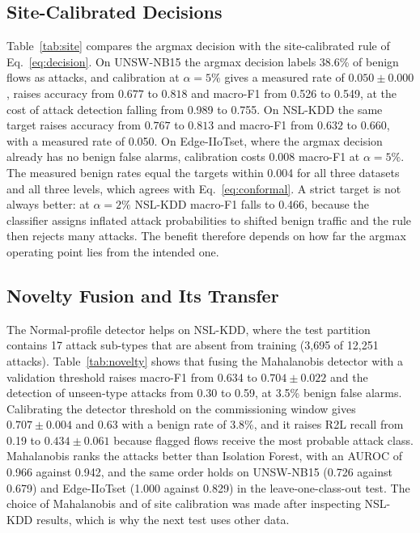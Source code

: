 \documentclass[journal]{IEEEtran}
\begin{document}
\subsection{Site-Calibrated Decisions}
Table~\ref{tab:site} compares the argmax decision with the site-calibrated rule of Eq.~\eqref{eq:decision}. On UNSW-NB15 the argmax decision labels 38.6\% of benign flows as attacks, and calibration at $\alpha=5\%$ gives a measured rate of $0.050\pm0.000$, raises accuracy from $0.677$ to $0.818$ and macro-F1 from 0.526 to 0.549, at the cost of attack detection falling from 0.989 to 0.755. On NSL-KDD the same target raises accuracy from $0.767$ to $0.813$ and macro-F1 from $0.632$ to $0.660$, with a measured rate of 0.050. On Edge-IIoTset, where the argmax decision already has no benign false alarms, calibration costs 0.008 macro-F1 at $\alpha=5\%$. The measured benign rates equal the targets within 0.004 for all three datasets and all three levels, which agrees with Eq.~\eqref{eq:conformal}. A strict target is not always better: at $\alpha=2\%$ NSL-KDD macro-F1 falls to 0.466, because the classifier assigns inflated attack probabilities to shifted benign traffic and the rule then rejects many attacks. The benefit therefore depends on how far the argmax operating point lies from the intended one.

\begin{table}[t]
\centering
\caption{LightGBM decision: argmax versus site-calibrated threshold.}
\label{tab:site}
\scriptsize
\setlength{\tabcolsep}{3pt}
\resizebox{\columnwidth}{!}{}
\end{table}

\subsection{Novelty Fusion and Its Transfer}
The Normal-profile detector helps on NSL-KDD, where the test partition contains 17 attack sub-types that are absent from training (3,695 of 12,251 attacks). Table~\ref{tab:novelty} shows that fusing the Mahalanobis detector with a validation threshold raises macro-F1 from 0.634 to $0.704\pm0.022$ and the detection of unseen-type attacks from 0.30 to 0.59, at 3.5\% benign false alarms. Calibrating the detector threshold on the commissioning window gives $0.707\pm0.004$ and 0.63 with a benign rate of 3.8\%, and it raises R2L recall from 0.19 to $0.434\pm0.061$ because flagged flows receive the most probable attack class. Mahalanobis ranks the attacks better than Isolation Forest, with an AUROC of 0.966 against 0.942, and the same order holds on UNSW-NB15 (0.726 against 0.679) and Edge-IIoTset (1.000 against 0.829) in the leave-one-class-out test. The choice of Mahalanobis and of site calibration was made after inspecting NSL-KDD results, which is why the next test uses other data.
\end{document}
